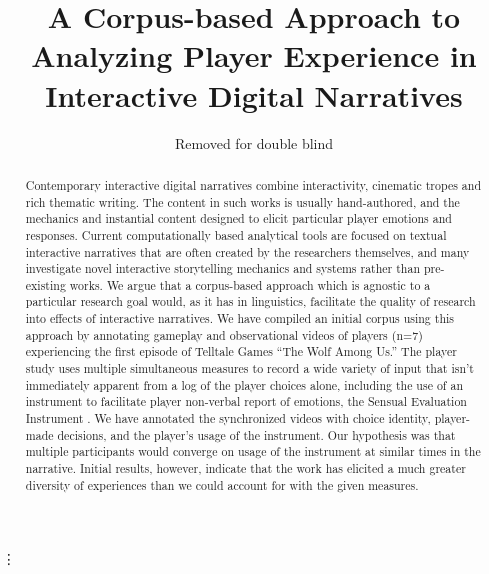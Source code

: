 \documentclass[letterpaper]{article} %
\begin{document}
%
\title{A Corpus-based Approach to \\Analyzing Player Experience in Interactive Digital Narratives}
\author{Removed for double blind
}
\maketitle
\begin{abstract}

Contemporary interactive digital narratives combine interactivity, cinematic tropes and rich thematic writing. The content in such works is usually hand-authored, and the mechanics and instantial content designed to elicit particular player emotions and responses. Current computationally based analytical tools are focused on textual interactive narratives that are often created by the researchers themselves, and many investigate novel interactive storytelling mechanics and systems rather than pre-existing works. We argue that a corpus-based approach which is agnostic to a particular research goal would, as it has in linguistics, facilitate the quality of research into effects of interactive narratives. We have compiled an initial corpus using this approach by annotating gameplay and observational videos of players (n=7) experiencing the first episode of Telltale Games “The Wolf Among Us.” The player study uses multiple simultaneous measures to record a wide variety of input that isn’t immediately apparent from a log of the player choices alone, including the use of an instrument to facilitate player non-verbal report of emotions, the Sensual Evaluation Instrument \cite{Isbister2006-sc}. We have annotated the synchronized videos with choice identity, player-made decisions, and the player’s usage of the instrument. Our hypothesis was that multiple participants would converge on usage of the instrument at similar times in the narrative. Initial results, however, indicate that the work has elicited a much greater diversity of experiences than we could account for with the given measures.  
\end{abstract}

\vdots{}


\end{document}

